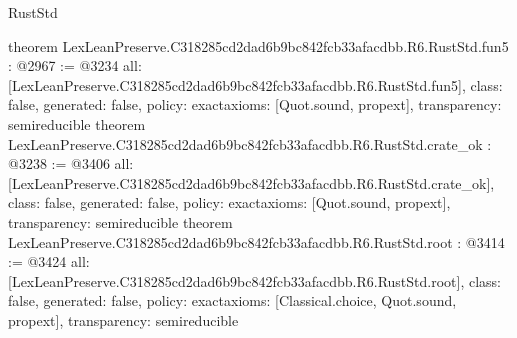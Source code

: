 \begin{lexlean}{RustStd}
\begin{coremodule}
{}
theorem LexLeanPreserve.C318285cd2dad6b9bc842fcb33afacdbb.R6.RustStd.fun5 : @2967 := @3234 {
  all: [LexLeanPreserve.C318285cd2dad6b9bc842fcb33afacdbb.R6.RustStd.fun5],
  class: false,
  generated: false,
  policy: exact{axioms: [Quot.sound, propext]},
  transparency: semireducible
}
theorem LexLeanPreserve.C318285cd2dad6b9bc842fcb33afacdbb.R6.RustStd.crate_ok : @3238 := @3406 {
  all: [LexLeanPreserve.C318285cd2dad6b9bc842fcb33afacdbb.R6.RustStd.crate_ok],
  class: false,
  generated: false,
  policy: exact{axioms: [Quot.sound, propext]},
  transparency: semireducible
}
theorem LexLeanPreserve.C318285cd2dad6b9bc842fcb33afacdbb.R6.RustStd.root : @3414 := @3424 {
  all: [LexLeanPreserve.C318285cd2dad6b9bc842fcb33afacdbb.R6.RustStd.root],
  class: false,
  generated: false,
  policy: exact{axioms: [Classical.choice, Quot.sound, propext]},
  transparency: semireducible
}


\end{coremodule}
\end{lexlean}
